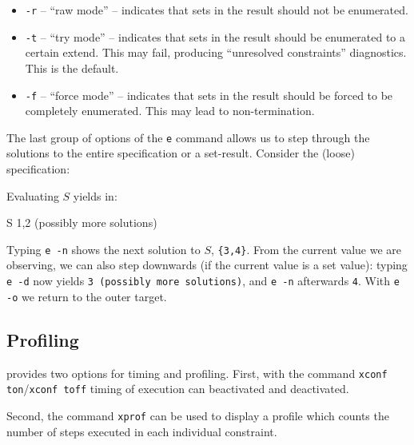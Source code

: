 \documentclass{article}
\begin{document}
\begin{itemize}
\item \verb:-r: -- ``raw mode'' -- indicates that sets in the
  result should not be enumerated.
\item \verb:-t: -- ``try mode'' -- indicates that sets in the
  result should be enumerated to a certain extend. This may
  fail, producing ``unresolved constraints'' diagnostics. This
  is the default.
\item \verb:-f: -- ``force mode'' -- indicates that sets in the
  result should be forced to be completely enumerated. This may lead
  to non-termination.
\end{itemize}

The last group of options of the \verb:e: command allows us
to step through the solutions to the entire specification
or a set-result. Consider the (loose) specification:

\begin{zedgroup}
\begin{zdirectives}
\end{zdirectives}
\end{zedgroup}

Evaluating $S$ yields in:

\begin{zexecexpr}
S
\yields
{1,2}
(possibly more solutions)
\end{zexecexpr}

Typing \verb:e -n: shows the next solution to $S$, \verb:{3,4}:.
From the current value we are observing, we can also step
downwards (if the current value is a set value): typing \verb:e -d:
now yields \verb:3 (possibly more solutions):, and \verb:e -n: afterwards
\verb:4:. With \verb:e -o: we return to the outer target.


\subsection{Profiling}

\ZAP{} provides two options for timing and profiling.  First, with the
command \verb:xconf ton:/\verb:xconf toff: timing of execution can
beactivated and deactivated.  

Second, the command \verb:xprof: can be used to display a profile
which counts the number of steps executed in each individual
constraint.
\end{document}
